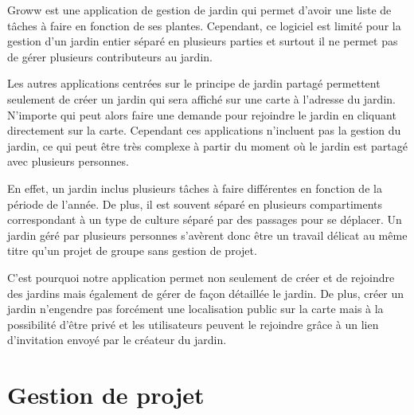 \documentclass[french,a4paper]{article}
\begin{document}
Groww est une application de gestion de jardin qui permet d’avoir une liste de tâches à faire en fonction de ses plantes. Cependant, ce logiciel est limité pour la gestion d’un jardin entier séparé en plusieurs parties et surtout il ne permet pas de gérer plusieurs contributeurs au jardin.

Les autres applications centrées sur le principe de jardin partagé permettent seulement de créer un jardin qui sera affiché sur une carte à l’adresse du jardin. N’importe qui peut alors faire une demande pour rejoindre le jardin en cliquant directement sur la carte. Cependant ces applications n’incluent pas la gestion du jardin, ce qui peut être très complexe à partir du moment où le jardin est partagé avec plusieurs personnes.

En effet, un jardin inclus plusieurs tâches à faire différentes en fonction de la période de l'année. De plus, il est souvent séparé en plusieurs compartiments correspondant à un type de culture séparé par des passages pour se déplacer. Un jardin géré par plusieurs personnes s'avèrent donc être un travail délicat au même titre qu'un projet de groupe sans gestion de projet. 

C’est pourquoi notre application permet non seulement de créer et de rejoindre des jardins mais également de gérer de façon détaillée le jardin. De plus, créer un jardin n’engendre pas forcément une localisation public sur la carte mais à la possibilité d'être privé et les utilisateurs peuvent le rejoindre grâce à un lien d’invitation envoyé par le créateur du jardin.


\newpage
\section{Gestion de projet}
\end{document}
